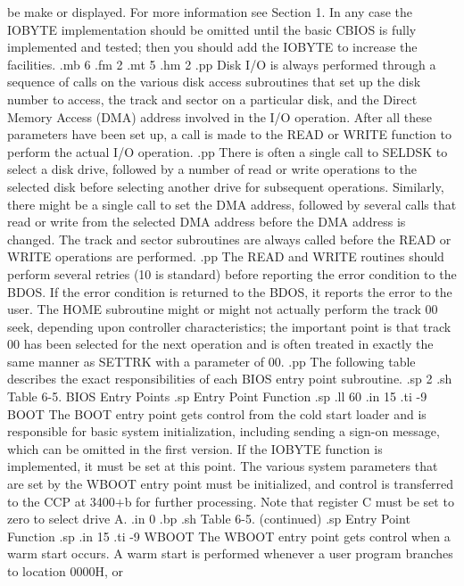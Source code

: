 be make or displayed.  For more information see Section 1.  In 
any case the IOBYTE implementation should be omitted until the 
basic CBIOS is fully implemented and tested; then you should 
add the IOBYTE to increase the facilities.
.mb 6
.fm 2
.mt 5
.hm 2
.pp
Disk I/O is always performed through a sequence of calls on the 
various disk access subroutines that set up the disk number to 
access, the track and sector on a particular disk, and the Direct 
Memory Access (DMA) address involved in the I/O operation.  After 
all these parameters have been set up, a call is made to the READ 
or WRITE function to perform the actual I/O operation.  
.pp
There is often a single call to SELDSK to select a disk drive, 
followed by a number of read or write operations to the selected 
disk before selecting another drive for subsequent operations.  
Similarly, there might be a single call to set the DMA address, 
followed by several calls that read or write from the selected 
DMA address before the DMA address is changed.  The track and 
sector subroutines are always called before the READ or WRITE 
operations are performed.
.pp
The READ and WRITE routines should perform several retries (10 is 
standard) before reporting the error condition to the BDOS.  If 
the error condition is returned to the BDOS, it reports the 
error to the user.  The HOME subroutine might or might not actually 
perform the track 00 seek, depending upon controller 
characteristics; the important point is that track 00 has been 
selected for the next operation and is often treated in exactly 
the same manner as SETTRK with a parameter of 00.
.pp
The following table describes the exact responsibilities of each 
BIOS entry point subroutine.
.sp 2
.sh
                  Table 6-5.  BIOS Entry Points
.sp
   Entry Point                    Function
.sp
.ll 60
.in 15
.ti -9
BOOT     The BOOT entry point gets control from the cold start loader and is 
responsible for basic system initialization, including sending a sign-on 
message, which can be omitted in the first version.  If the IOBYTE function 
is implemented, it must be set at this point.  The various system parameters 
that are set by the WBOOT entry point must be initialized, and control is 
transferred to the CCP at 3400+b for further processing.  Note that register 
C must be set to zero to select drive A.
.in 0
.bp
.sh
                     Table 6-5.  (continued)
.sp
   Entry Point                    Function
.sp
.in 15
.ti -9
WBOOT    The WBOOT entry point gets control when a warm start occurs.  A warm 
start is performed whenever a user program branches to location 0000H, or 
